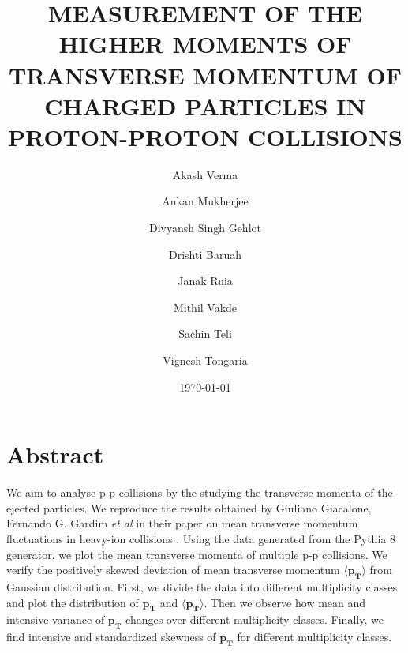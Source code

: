 \documentclass[letterpaper,aps,prc,superscriptaddress,nofootinbib,10pt,showpacs,floatfix]{revtex4-2}
\begin{document}
\title{MEASUREMENT OF THE HIGHER MOMENTS OF TRANSVERSE MOMENTUM OF CHARGED PARTICLES IN PROTON-PROTON COLLISIONS}
\author{Akash Verma}
\author{Ankan Mukherjee} 
\author{Divyansh Singh Gehlot}
\author{Drishti Baruah}
\author{Janak Ruia}
\author{Mithil Vakde}
\author{Sachin Teli}
\author{Vignesh Tongaria}


\date{\today}  



\maketitle
\vspace{-10mm}
\section*{Abstract}
\vspace{-2mm}
\begin{adjustwidth}{20pt}{20pt}
We aim to analyse p-p collisions by the studying the transverse momenta of the ejected particles. We reproduce the results obtained by Giuliano Giacalone, Fernando G. Gardim {\it et al} in their paper on mean transverse momentum fluctuations in heavy-ion collisions \cite{fluct}. Using the data generated from the Pythia 8 generator, we plot the mean transverse momenta of multiple p-p collisions. We verify the positively skewed deviation of mean transverse momentum $\mathbf{\langle p_T \rangle}$  from Gaussian distribution. First, we divide the data into different multiplicity classes and plot the distribution of $\mathbf{p_T}$ and $\mathbf{\langle  p_T\rangle}$. Then we observe how mean and intensive variance of $\mathbf{p_T}$ changes over different multiplicity classes. Finally, we find intensive and standardized skewness of $\mathbf{p_T}$ for different multiplicity classes. 
\end{adjustwidth}
\vspace{-2mm}
\end{document}
